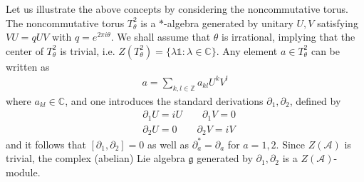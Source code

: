 \documentclass{amsart}
\newcommand{\complex}{\mathbb{C}}
\newcommand{\integers}{\mathbb{Z}}
\theoremstyle{definition}
\theoremstyle{remark}
\numberwithin{equation}{section}
\newcommand{\A}{\mathcal{A}}
\renewcommand{\mid}{\mathds{1}}
\renewcommand{\d}{\partial}
\newcommand{\g}{\mathfrak{g}}
\newcommand{\Ttwotheta}{T^2_{\theta}}
\begin{document}
\noindent
Let us illustrate the above concepts by considering the noncommutative
torus. The noncommutative torus $\Ttwotheta$ is a $\ast$-algebra
generated by unitary $U,V$ satisfying $VU=qUV$ with
$q=e^{2\pi i\theta}$. We shall assume that $\theta$ is irrational,
implying that the center of $\Ttwotheta$ is trivial,
i.e. $Z(\Ttwotheta)=\{\lambda\mid:\lambda\in\complex\}$. Any element
$a\in\Ttwotheta$ can be written as
\begin{align*}
  a = \sum_{k,l\in\integers}a_{kl}U^kV^l
\end{align*}
where $a_{kl}\in\complex$, and one introduces the standard derivations
$\d_1,\d_2$, defined by
\begin{align*}
  &\d_1U = iU\qquad \d_1V = 0\\
  &\d_2U = 0 \qquad \d_2V = iV
\end{align*}
and it follows that $[\d_1,\d_2]=0$ as well as $\d_a^\ast=\d_a$ for
$a=1,2$. Since $Z(\A)$ is trivial, the complex (abelian) Lie algebra $\g$
generated by $\d_1,\d_2$ is a $Z(\A)$-module.
\end{document}
